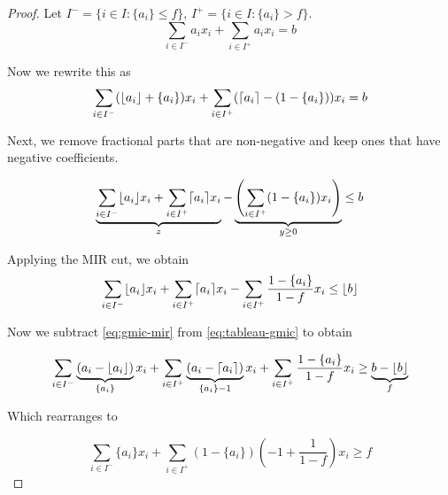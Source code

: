 \begin{proof}
Let $I^- = \{ i \in I : \{a_i\} \leq f\}$, $I^+ = \{i \in I : \{a_i\}> f\}$.
\begin{equation}
\label{eq:tableau-gmic}
\sum_{i \in I^{-}} a_ix_i + \sum_{i \in I^+} a_i x_i = b
\end{equation}

Now we rewrite this as
\begin{equation}
\sum_{i \in I^{-}} (\lfloor a_i \rfloor + \{a_i\} )x_i + \sum_{i \in I^+} (\lceil a_i \rceil - (1- \{a_i\})) x_i  = b
\end{equation}

Next, we remove fractional parts that are non-negative and keep ones that have negative coefficients.

\begin{equation}
\underbrace{\sum_{i \in I^{-}} \lfloor a_i \rfloor x_i + \sum_{i \in I^+} \lceil a_i \rceil x_i }_{z} - \underbrace{\left( \sum_{i \in I^+}  (1- \{a_i\}) x_i \right)}_{y \geq 0} \leq b
\end{equation}

Applying the MIR cut, we obtain
\begin{equation}
\label{eq:gmic-mir}
\sum_{i \in I^{-}} \lfloor a_i \rfloor x_i + \sum_{i \in I^+} \lceil a_i \rceil x_i - \sum_{i \in I^+}  \frac{1- \{a_i\}}{1-f} x_i \leq \lfloor b \rfloor
\end{equation}

Now we subtract \eqref{eq:gmic-mir} from \eqref{eq:tableau-gmic} to obtain

\begin{equation}
\label{eq:gmic-close}
\sum_{i \in I^{-}} \underbrace{(a_i - \lfloor a_i \rfloor)}_{\{a_i\}}x_i + \sum_{i \in I^+} \underbrace{(a_i - \lceil a_i \rceil)}_{\{a_i\} - 1}x_i + \sum_{i \in I^+}  \frac{1- \{a_i\}}{1-f} x_i \geq \underbrace{b - \lfloor b \rfloor}_{f}
\end{equation}

Which rearranges to 


\begin{equation}
\label{eq:gmic-close2}
\sum_{i \in I^{-}} \{a_i\} x_i + \sum_{i \in I^+} (1-\{a_i\})\left(-1+\frac{1}{1-f}\right)x_i\geq f
\end{equation}


\end{proof}
